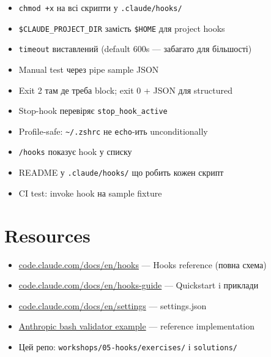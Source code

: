 \documentclass[11pt,a4paper]{article}
\begin{document}
\begin{itemize}[leftmargin=2em]
\item[$\square$] \texttt{chmod +x} на всі скрипти у \texttt{.claude/hooks/}
\item[$\square$] \texttt{\$CLAUDE\_PROJECT\_DIR} замість \texttt{\$HOME} для project hooks
\item[$\square$] \texttt{timeout} виставлений (default 600s --- забагато для більшості)
\item[$\square$] Manual test через pipe sample JSON
\item[$\square$] Exit 2 там де треба block; exit 0 + JSON для structured
\item[$\square$] Stop-hook перевіряє \texttt{stop\_hook\_active}
\item[$\square$] Profile-safe: \texttt{\textasciitilde/.zshrc} не \texttt{echo}-ить unconditionally
\item[$\square$] \texttt{/hooks} показує hook у списку
\item[$\square$] README у \texttt{.claude/hooks/} що робить кожен скрипт
\item[$\square$] CI test: invoke hook на sample fixture
\end{itemize}

\section{Resources}

\begin{itemize}
\item \href{https://code.claude.com/docs/en/hooks}{code.claude.com/docs/en/hooks} --- Hooks reference (повна схема)
\item \href{https://code.claude.com/docs/en/hooks-guide}{code.claude.com/docs/en/hooks-guide} --- Quickstart i приклади
\item \href{https://code.claude.com/docs/en/settings}{code.claude.com/docs/en/settings} --- settings.json
\item \href{https://github.com/anthropics/claude-code/blob/main/examples/hooks/bash_command_validator_example.py}{Anthropic bash validator example} --- reference implementation
\item Цей репо: \texttt{workshops/05-hooks/exercises/} і \texttt{solutions/}
\end{itemize}
\end{document}
